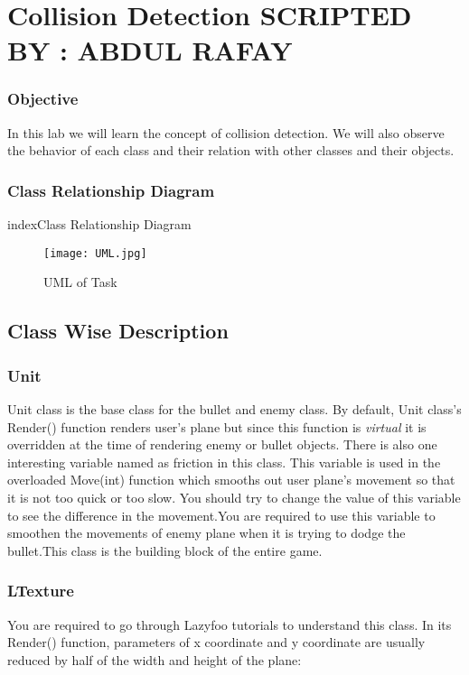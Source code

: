 \documentclass[11pt,fleqn]{book} %
\begin{document}
 \chapter{Collision Detection \hspace{38mm} {\textsc{\small SCRIPTED BY : ABDUL RAFAY}}}
 \subsection{Objective}
 In this lab we will learn the concept of collision detection. We will also observe the behavior of each class and their relation with other classes and their objects.
 \subsection{Class Relationship Diagram}index{Class Relationship Diagram}
 \begin{figure}[h]
 	\centering\texttt{[image: UML.jpg]}
 	\caption{UML of Task}
 \end{figure}
 \newpage
 \section{Class Wise Description}
 \subsection{Unit}
 Unit class is the base class for the bullet and enemy class. By default, Unit class's Render() function renders user's plane but since this function is \emph{virtual} it is overridden at the time of rendering enemy or bullet objects. There is also one interesting variable named as friction in this class. This variable is used in the overloaded Move(int) function which smooths out user plane's movement so that it is not too quick or too slow. You should try to change the value of this variable to see the difference in the movement.You are required to use this variable to smoothen the movements of enemy plane when it is trying to dodge the bullet.This class is the building block of the entire game.
 \subsection{LTexture}
 You are required to go through Lazyfoo tutorials to understand this class.
 In its Render() function, parameters of x coordinate and y coordinate are usually reduced by half of the width and height of the plane:\\
 
\end{document}
